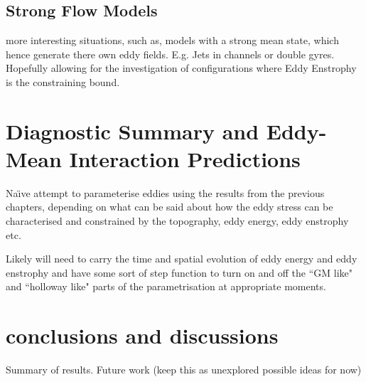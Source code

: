 \documentclass[10pt,a4paper]{report}
\begin{document}
\section{Strong Flow Models}

more interesting situations, such as, models
with a strong mean state, which hence
generate there own eddy fields. E.g. Jets in
channels or double gyres. Hopefully allowing 
for the investigation of configurations where 
Eddy Enstrophy is the constraining bound.


\chapter{Diagnostic Summary and Eddy-Mean Interaction Predictions}

Na\"{\i}ve attempt to parameterise eddies using the 
results from the previous chapters, depending
on what can be said about how the eddy stress can
be characterised and constrained by the topography,
eddy energy, eddy enstrophy etc. 

Likely will need to carry the time and spatial
evolution of eddy energy and eddy enstrophy and have
some sort of step function to turn on and off the
``GM like" and ``holloway like" parts of the parametrisation at appropriate moments.


\chapter{conclusions and discussions}

Summary of results.
Future work (keep this as unexplored possible ideas for now)

	 \printbibliography
\end{document}

